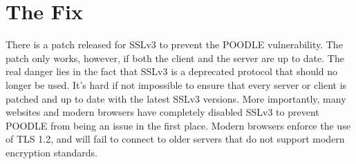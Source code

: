 \documentclass[10pt]{article}
\begin{document}
\section*{The Fix}
There is a patch released for SSLv3 to prevent the POODLE vulnerability. The patch
only works, however, if both the client and the server are up to date. The real
danger lies in the fact that SSLv3 is a deprecated protocol that should no longer
be used.\cite{disablessl3} It's hard if not impossible to ensure that every
server or client is patched and up to date with the latest SSLv3 versions. More
importantly, many websites and modern browsers have completely disabled SSLv3 to
prevent POODLE from being an issue in the first place. Modern browsers enforce
the use of TLS 1.2, and will fail to connect to older servers that do not support
modern encryption standards.



\end{document}
